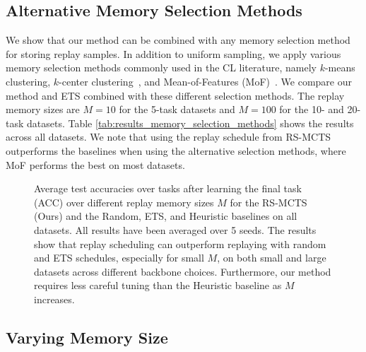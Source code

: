 %
\subsection{Alternative Memory Selection Methods}
\label{paperC:sec:alternative_memory_selection_methods}

We show that our method can be combined with any memory selection method for storing replay samples. In addition to uniform sampling, we apply various memory selection methods commonly used in the CL literature, namely $k$-means clustering, $k$-center clustering~, and Mean-of-Features (MoF)~. We compare our method and ETS combined with these different selection methods. 
The replay memory sizes are $M=10$ for the 5-task datasets and $M=100$ for the 10- and 20-task datasets.  
Table \ref{tab:results_memory_selection_methods} shows the results across all datasets. 
We note that using the replay schedule from RS-MCTS outperforms the baselines when using the alternative selection methods, where MoF performs the best on most datasets. 


%
\begin{figure}[t]
	\centering
	\setlength{\figwidth}{0.35\textwidth}
	\setlength{\figheight}{.16\textheight}%
	
	\vspace{-3mm}
	\caption{Average test accuracies over tasks after learning the final task (ACC) over different replay memory sizes $M$ for the RS-MCTS (Ours) and the Random, ETS, and Heuristic baselines on all datasets.
		All results have been averaged over 5 seeds. The results show that replay scheduling can outperform replaying with random and ETS schedules, %
		especially for small $M$, on both small and large datasets across different backbone choices. Furthermore, our method requires less careful tuning than the Heuristic baseline as $M$ increases.
	}
	\vspace{-3mm}
	\label{fig:acc_over_replay_memory_size}
\end{figure}



%
\subsection{Varying Memory Size}
\label{paperC:sec:results_with_varying_replay_memory_size}

